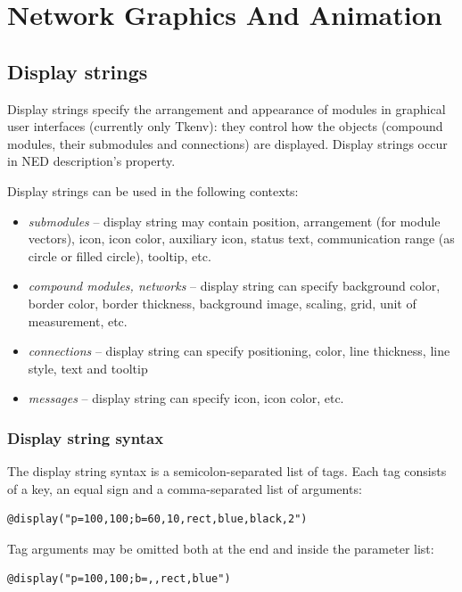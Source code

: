 \chapter{Network Graphics And Animation}
\label{cha:graphics}

\section{Display strings}
\label{sec:ch-graphics:display-strings}

Display strings specify the arrangement and
appearance of modules in graphical user interfaces (currently only
Tkenv): they control how the objects (compound modules, their
submodules and connections) are displayed. Display strings occur in
NED description's 
property.

Display strings can be used in the following contexts:
\begin{itemize}
  \item \textit{submodules} -- display string may contain position, arrangement
        (for module vectors), icon, icon color, auxiliary icon, status text,
        communication range (as circle or filled circle), tooltip, etc.
  \item \textit{compound modules, networks} -- display string can specify
        background color, border color, border thickness,
        background image, scaling, grid, unit of measurement, etc.
  \item \textit{connections} -- display string can specify positioning, color,
        line thickness, line style, text and tooltip
  \item \textit{messages} -- display string can specify icon, icon color, etc.
\end{itemize}


\subsection{Display string syntax}

The display string syntax is a semicolon-separated list of tags.
Each tag consists of a key, an equal sign and a comma-separated list of
arguments:
\begin{verbatim}
@display("p=100,100;b=60,10,rect,blue,black,2")
\end{verbatim}

Tag arguments may be omitted both at the end and inside the
parameter list:
\begin{verbatim}
@display("p=100,100;b=,,rect,blue")
\end{verbatim}

